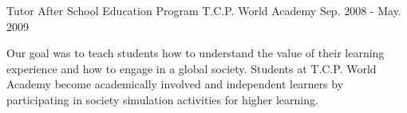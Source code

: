 \begin{cventries}
{%
    }
  \cventry
    {Tutor} %
    {After School Education Program} %
    {T.C.P. World Academy} %
    {Sep. 2008 - May. 2009} %
    {
      \begin{cvcompactparagraph}
        Our goal was to teach students how to understand the value of their learning experience and how to engage in a global society.  Students at T.C.P. World Academy become academically involved and independent learners by participating in society simulation activities for higher learning.
      \end{cvcompactparagraph}
    }
\end{cventries}
